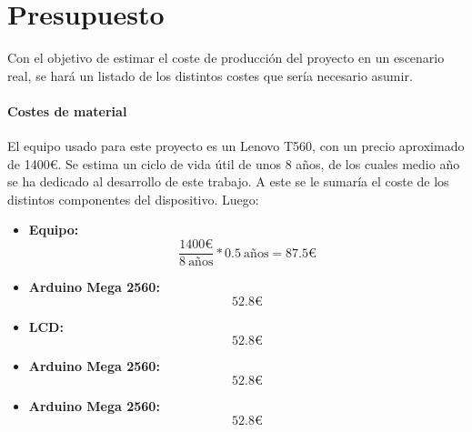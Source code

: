 \chapter{Presupuesto}

Con el objetivo de estimar el coste de producción del proyecto en un escenario real, se hará un listado de los distintos costes que sería necesario asumir.

\subsubsection{Costes de material}

El equipo usado para este proyecto es un Lenovo T560, con un precio aproximado de 1400€. Se estima un ciclo de vida útil de unos 8 años, de los cuales medio año se ha dedicado al desarrollo de este trabajo. A este se le sumaría el coste de los distintos componentes del dispositivo. Luego:

\begin{itemize}
    \item\textbf{Equipo:} \[\frac{1400\text{€}}{8\ \text{años}} * 0.5\ \text{años} = 87.5\text{€}\]
\end{itemize}

\begin{itemize}
    \item\textbf{Arduino Mega 2560:} \[ 52.8\text{€} \]
\end{itemize}

\begin{itemize}
    \item\textbf{LCD:} \[ 52.8\text{€} \]
\end{itemize}

\begin{itemize}
    \item\textbf{Arduino Mega 2560:} \[ 52.8\text{€} \]
\end{itemize}

\begin{itemize}
    \item\textbf{Arduino Mega 2560:} \[ 52.8\text{€} \]
\end{itemize}
